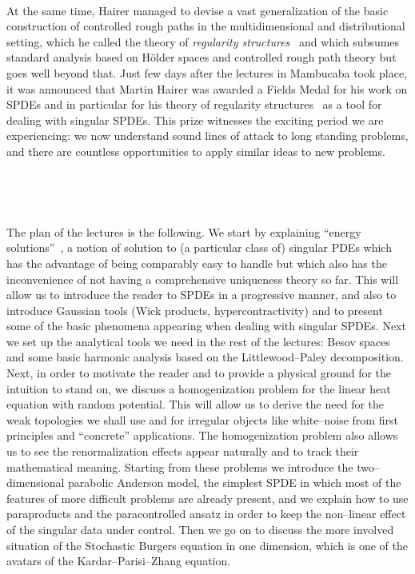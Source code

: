 \documentclass[a4paper,11pt]{article}
\newcommand{\tmem}[1]{{\em #1\/}}
\begin{document}
\

At the same time, Hairer managed to devise a vast generalization of the basic
construction of controlled rough paths in the multidimensional and
distributional setting, which he called the theory of {\tmem{regularity
structures}}~{\cite{Hairer2014}} and which subsumes standard analysis based on
H{\"o}lder spaces and controlled rough path theory but goes well beyond that.
Just few days after the lectures in Mambucaba took place, it was announced
that Martin Hairer was awarded a Fields Medal for his work on SPDEs and in
particular for his theory of regularity structures~{\cite{Hairer2014}} as a
tool for dealing with singular SPDEs. This prize witnesses the exciting period
we are experiencing: we now understand sound lines of attack to long standing
problems, and there are countless opportunities to apply similar ideas to new
problems.

\

\

The plan of the lectures is the following. We start by explaining ``energy
solutions''~{\cite{goncalves_universality_2010,gubinelli_regularization_2013}},
a notion of solution to (a particular class of) singular PDEs which has the
advantage of being comparably easy to handle but which also has the
inconvenience of not having a comprehensive uniqueness theory so far. This
will allow us to introduce the reader to SPDEs in a progressive manner, and
also to introduce Gaussian tools (Wick products, hypercontractivity) and to
present some of the basic phenomena appearing when dealing with singular
SPDEs. Next we set up the analytical tools we need in the rest of the
lectures: Besov spaces and some basic harmonic analysis based on the
Littlewood--Paley decomposition. Next, in order to motivate the reader and to
provide a physical ground for the intuition to stand on, we discuss a
homogenization problem for the linear heat equation with random potential.
This will allow us to derive the need for the weak topologies we shall use and
for irregular objects like white--noise from first principles and ``concrete''
applications. The homogenization problem also allows us to see the
renormalization effects appear naturally and to track their mathematical
meaning. Starting from these problems we introduce the two--dimensional
parabolic Anderson model, the simplest SPDE in which most of the features of
more difficult problems are already present, and we explain how to use
paraproducts and the paracontrolled ansatz in order to keep the non--linear
effect of the singular data under control. Then we go on to discuss the more
involved situation of the Stochastic Burgers equation in one dimension, which
is one of the avatars of the Kardar--Parisi--Zhang equation.
\end{document}
